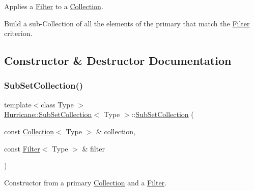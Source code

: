 Applies a \mbox{\hyperlink{classHurricane_1_1Filter}{Filter}} to a \mbox{\hyperlink{classHurricane_1_1Collection}{Collection}}. 

Build a sub-\/\+Collection of all the elements of the primary that match the \mbox{\hyperlink{classHurricane_1_1Filter}{Filter}} criterion. 

\subsection{Constructor \& Destructor Documentation}
\mbox{\label{classHurricane_1_1SubSetCollection_a6da1f511e27351cdc8b56bda7fbc44e8}} 
\subsubsection{\texorpdfstring{Sub\+Set\+Collection()}{SubSetCollection()}\hspace{0.1cm}{\footnotesize\ttfamily [1/2]}}
{\footnotesize\ttfamily template$<$class Type $>$ \\
\mbox{\hyperlink{classHurricane_1_1SubSetCollection}{Hurricane\+::\+Sub\+Set\+Collection}}$<$ Type $>$\+::\mbox{\hyperlink{classHurricane_1_1SubSetCollection}{Sub\+Set\+Collection}} (\begin{DoxyParamCaption}\item[{const \mbox{\hyperlink{classHurricane_1_1Collection}{Collection}}$<$ Type $>$ \&}]{collection,  }\item[{const \mbox{\hyperlink{classHurricane_1_1Filter}{Filter}}$<$ Type $>$ \&}]{filter }\end{DoxyParamCaption})\hspace{0.3cm}{\ttfamily [inline]}}

Constructor from a primary \mbox{\hyperlink{classHurricane_1_1Collection}{Collection}} and a \mbox{\hyperlink{classHurricane_1_1Filter}{Filter}}. \mbox{\label{classHurricane_1_1SubSetCollection_ad4e0bd9554d898f3991585758dbf2aac}} 
